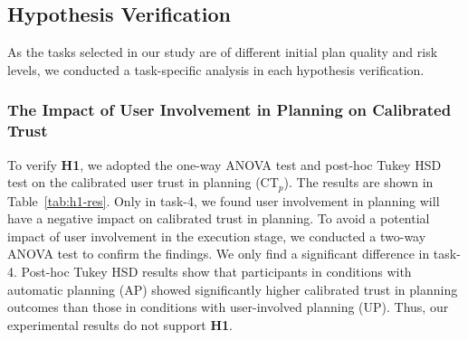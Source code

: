 \subsection{Hypothesis Verification}
As the tasks selected in our study are of different initial plan quality and risk levels, we conducted a task-specific analysis in each hypothesis verification.

\subsubsection{The Impact of User Involvement in Planning on Calibrated Trust} 
To verify \textbf{H1}, we adopted the one-way ANOVA test and post-hoc Tukey HSD test on the calibrated user trust in planning (\ie CT$_p$). 
The results are shown in Table~\ref{tab:h1-res}. 
Only in task-4, we found user involvement in planning will have a negative impact on calibrated trust in planning. 
To avoid a potential impact of user involvement in the execution stage, we conducted a two-way ANOVA test to confirm the findings. 
We only find a significant difference in task-4.
Post-hoc Tukey HSD results show that participants in conditions with automatic planning (AP) showed significantly higher calibrated trust in planning outcomes than those in conditions with user-involved planning (UP). 
Thus, our experimental results do not support \textbf{H1}.

